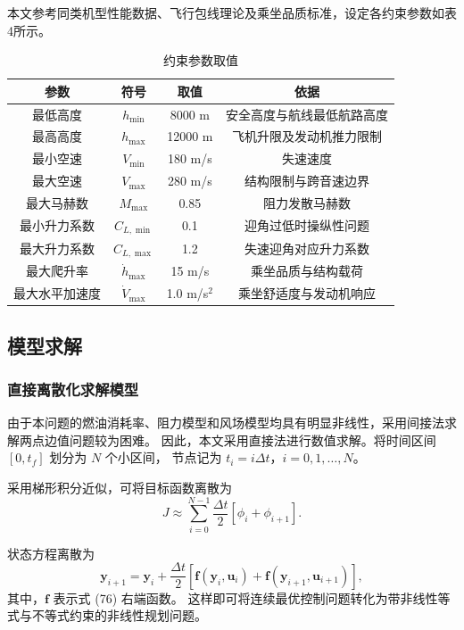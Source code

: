 \documentclass[UTF8]{ctexart}
\begin{document}
本文参考同类机型性能数据\cite{11}\cite{12}、飞行包线理论\cite{10}及乘坐品质标准\cite{12}，设定各约束参数如表4所示。

\begin{table}[htbp]
\centering
\caption{约束参数取值}
\label{tab:const_params}
\begin{tabular}{cccc}
\toprule
参数 & 符号 & 取值 & 依据 \\
\midrule
最低高度 & $h_{\min}$ & 8000 m & 安全高度与航线最低航路高度 \\
最高高度 & $h_{\max}$ & 12000 m & 飞机升限及发动机推力限制 \\
最小空速 & $V_{\min}$ & 180 m/s & 失速速度 \\
最大空速 & $V_{\max}$ & 280 m/s & 结构限制与跨音速边界 \\
最大马赫数 & $M_{\max}$ & 0.85 & 阻力发散马赫数 \\
最小升力系数 & $C_{L,\min}$ & 0.1 & 迎角过低时操纵性问题 \\
最大升力系数 & $C_{L,\max}$ & 1.2 & 失速迎角对应升力系数 \\
最大爬升率 & $\dot h_{\max}$ & 15 m/s & 乘坐品质与结构载荷 \\
最大水平加速度 & $\dot V_{\max}$ & 1.0 m/s$^2$ & 乘坐舒适度与发动机响应 \\
\bottomrule
\end{tabular}
\end{table}
\subsection{模型求解}
\subsubsection{直接离散化求解模型}
由于本问题的燃油消耗率、阻力模型和风场模型均具有明显非线性，采用间接法求解两点边值问题较为困难。
因此，本文采用直接法进行数值求解。将时间区间 $[0,t_f]$ 划分为 $N$ 个小区间，
节点记为 $t_i=i\Delta t$，$i=0,1,\ldots,N$。

采用梯形积分近似，可将目标函数离散为
\begin{equation}
    J
    \approx
    \sum_{i=0}^{N-1}
    \frac{\Delta t}{2}
    \left[
    \phi_i+\phi_{i+1}
    \right].
    \label{eq:q3_discrete_objective}
\end{equation}
  
状态方程离散为
\begin{equation}
    \boldsymbol y_{i+1}
    =
    \boldsymbol y_i
    +
    \frac{\Delta t}{2}
    \left[
    \boldsymbol f(\boldsymbol y_i,\boldsymbol u_i)
    +
    \boldsymbol f(\boldsymbol y_{i+1},\boldsymbol u_{i+1})
    \right],
    \label{eq:q3_trapezoid}
\end{equation}
其中，$\boldsymbol f$ 表示式 (76) 右端函数。
这样即可将连续最优控制问题转化为带非线性等式与不等式约束的非线性规划问题。
\end{document}
